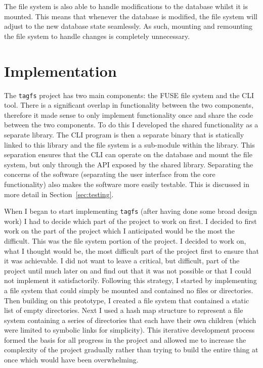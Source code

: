 The file system is also able to handle modifications to the database whilst it
is mounted. This means that whenever the database is modified, the file system
will adjust to the new database state seamlessly. As such, mounting and
remounting the file system to handle changes is completely unnecessary.

\section{Implementation}
\label{sec:implementation}

The \texttt{tagfs} project has two main components: the FUSE file system and
the CLI tool. There is a significant overlap in functionality between the two
components, therefore it made sense to only implement functionality once and
share the code between the two components. To do this I developed the shared
functionality as a separate library.
The CLI program is then a separate binary that is statically linked to this
library and the file system is a sub-module within the library. This separation
ensures that the CLI can operate on the database and mount the file system, but
only through the API exposed by the shared library. Separating the concerns of
the software (separating the user interface from the core functionality) also
makes the software more easily testable. This is discussed in more detail in
Section~\ref{sec:testing}.

When I began to start implementing \texttt{tagfs} (after having done some broad
design work) I had to decide which part of the project to work on first. I
decided to first work on the part of the project which I anticipated would be
the most the difficult. This was the file system portion of the project. I
decided to work on, what I thought would be, the most difficult part of the
project first to ensure that it was achievable. I did not want to leave a
critical, but difficult, part of the project until much later on and find out
that it was not possible or that I could not implement it satisfactorily.
Following this strategy, I started by implementing a file system that could
simply be mounted and contained no files or directories. Then building on this
prototype, I created a file system that contained a static list of empty
directories. Next I used a hash map structure to represent a file system
containing a series of directories that each have their own children (which
were limited to symbolic links for simplicity). This iterative development
process formed the basis for all progress in the project and allowed me to
increase the complexity of the project gradually rather than trying to build
the entire thing at once which would have been overwhelming.

